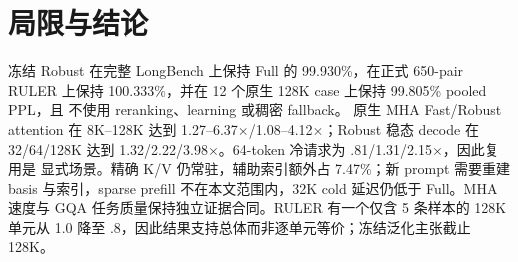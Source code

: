 \section{局限与结论}
\label{sec:conclusion}

冻结 Robust 在完整 LongBench 上保持 Full 的 99.930\%，在正式 650-pair RULER
上保持 100.333\%，并在 12 个原生 128K case 上保持 99.805\% pooled PPL，且
不使用 reranking、learning 或稠密 fallback。
原生 MHA Fast/Robust attention 在 8K--128K 达到
1.27--6.37$\times$/1.08--4.12$\times$；Robust 稳态 decode 在 32/64/128K 达到
1.32/2.22/3.98$\times$。64-token 冷请求为 .81/1.31/2.15$\times$，因此复用是
显式场景。精确 K/V 仍常驻，辅助索引额外占 7.47\%；新 prompt 需要重建 basis
与索引，sparse prefill 不在本文范围内，32K cold 延迟仍低于 Full。MHA 速度与
GQA 任务质量保持独立证据合同。RULER 有一个仅含 5 条样本的 128K 单元从 1.0
降至 .8，因此结果支持总体而非逐单元等价；冻结泛化主张截止 128K。
